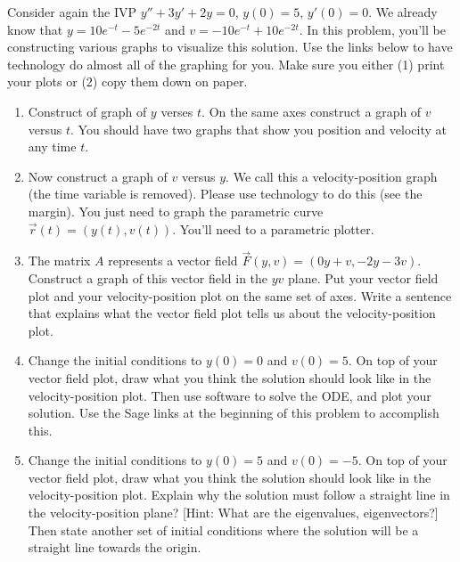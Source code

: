 \begin{problem}
Consider again the IVP $y''+3y'+2y=0$, $y(0)=5$, $y'(0)=0$.  We already know that $y = 10e^{-t}-5e^{-2t}$ and $v = -10e^{-t}+10e^{-2t}$. In this problem, you'll be constructing various graphs to visualize this solution. Use the links below to have technology do almost all of the graphing for you. Make sure you either (1) print your plots or (2) copy them down on paper. 
\begin{enumerate}
\item {}%
Construct of graph of $y$ verses $t$. On the same axes construct a graph of $v$ versus $t$. You should have two graphs that show you position and velocity at any time $t$.  
\item Now construct a graph of $v$ versus $y$.  We call this a velocity-position graph (the time variable is removed). Please use technology to do this (see the margin).  You just need to graph the parametric curve $\vec r(t) = (y(t), v(t))$. You'll need to a parametric plotter. 
\item The matrix $A$ represents a vector field $\vec F(y,v) = (0y+v, -2y-3v)$. Construct a graph of this vector field in the $yv$ plane. Put your vector field plot and your velocity-position plot on the same set of axes.  Write a sentence that explains what the vector field plot tells us about the velocity-position plot.
\item {}%
Change the initial conditions to $y(0)=0$ and $v(0)=5$.  On top of your vector field plot, draw what you think the solution should look like in the velocity-position plot. Then use software to solve the ODE, and plot your solution. Use the Sage links at the beginning of this problem to accomplish this.
\item Change the initial conditions to $y(0)=5$ and $v(0)=-5$.  On top of your vector field plot, draw what you think the solution should look like in the velocity-position plot. Explain why the solution must follow a straight line in the velocity-position plane?  [Hint: What are the eigenvalues, eigenvectors?]  Then state another set of initial conditions where the solution will be a straight line towards the origin.
\end{enumerate}

\end{problem}

